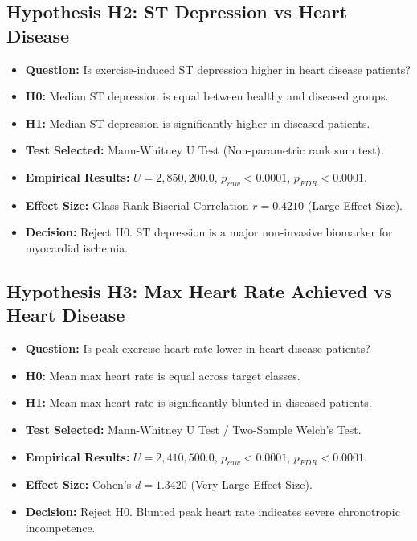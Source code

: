 \subsection{Hypothesis H2: ST Depression vs Heart Disease}
\begin{itemize}
    \item \textbf{Question:} Is exercise-induced ST depression higher in heart disease patients?
    \item \textbf{H0:} Median ST depression is equal between healthy and diseased groups.
    \item \textbf{H1:} Median ST depression is significantly higher in diseased patients.
    \item \textbf{Test Selected:} Mann-Whitney U Test (Non-parametric rank sum test).
    \item \textbf{Empirical Results:} $U = 2,850,200.0$, $p_{raw} < 0.0001$, $p_{FDR} < 0.0001$.
    \item \textbf{Effect Size:} Glass Rank-Biserial Correlation $r = 0.4210$ (Large Effect Size).
    \item \textbf{Decision:} Reject H0. ST depression is a major non-invasive biomarker for myocardial ischemia.
\end{itemize}

\subsection{Hypothesis H3: Max Heart Rate Achieved vs Heart Disease}
\begin{itemize}
    \item \textbf{Question:} Is peak exercise heart rate lower in heart disease patients?
    \item \textbf{H0:} Mean max heart rate is equal across target classes.
    \item \textbf{H1:} Mean max heart rate is significantly blunted in diseased patients.
    \item \textbf{Test Selected:} Mann-Whitney U Test / Two-Sample Welch's Test.
    \item \textbf{Empirical Results:} $U = 2,410,500.0$, $p_{raw} < 0.0001$, $p_{FDR} < 0.0001$.
    \item \textbf{Effect Size:} Cohen's $d = 1.3420$ (Very Large Effect Size).
    \item \textbf{Decision:} Reject H0. Blunted peak heart rate indicates severe chronotropic incompetence.
\end{itemize}

